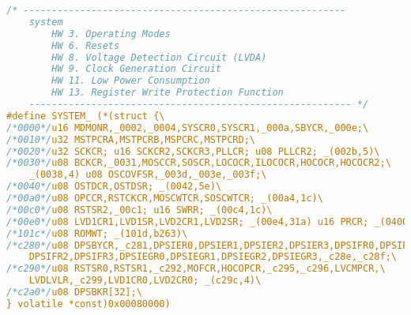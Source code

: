 \documentclass[a4paper, 11pt, fleqn, twoside]{scrartcl}%
\begin{document}
\begin{lstlisting}[language=C,backgroundcolor=\color{orange!10},framerule=0pt,columns=fixed]
	/* ---------------------------------------------------------
	system
		HW 3. Operating Modes
		HW 6. Resets
		HW 8. Voltage Detection Circuit (LVDA)
		HW 9. Clock Generation Circuit
		HW 11. Low Power Consumption
		HW 13. Register Write Protection Function
	--------------------------------------------------------- */
#define SYSTEM_ (*(struct {\
/*0000*/u16 MDMONR,_0002,_0004,SYSCR0,SYSCR1,_000a,SBYCR,_000e;\
/*0010*/u32 MSTPCRA,MSTPCRB,MSPCRC,MSTPCRD;\
/*0020*/u32 SCKCR; u16 SCKCR2,SCKCR3,PLLCR; u08 PLLCR2; _(002b,5)\
/*0030*/u08 BCKCR,_0031,MOSCCR,SOSCR,LOCOCR,ILOCOCR,HOCOCR,HOCOCR2;\
    _(0038,4) u08 OSCOVFSR,_003d,_003e,_003f;\
/*0040*/u08 OSTDCR,OSTDSR; _(0042,5e)\
/*00a0*/u08 OPCCR,RSTCKCR,MOSCWTCR,SOSCWTCR; _(00a4,1c)\
/*00c0*/u08 RSTSR2,_00c1; u16 SWRR; _(00c4,1c)\
/*00e0*/u08 LVD1CR1,LVD1SR,LVD2CR1,LVD2SR; _(00e4,31a) u16 PRCR; _(0400,c1c)\
/*101c*/u08 ROMWT; _(101d,b263)\
/*c280*/u08 DPSBYCR,_c281,DPSIER0,DPSIER1,DPSIER2,DPSIER3,DPSIFR0,DPSIFR1,\
    DPSIFR2,DPSIFR3,DPSIEGR0,DPSIEGR1,DPSIEGR2,DPSIEGR3,_c28e,_c28f;\
/*c290*/u08 RSTSR0,RSTSR1,_c292,MOFCR,HOCOPCR,_c295,_c296,LVCMPCR,\
    LVDLVLR,_c299,LVD1CR0,LVD2CR0; _(c29c,4)\
/*c2a0*/u08 DPSBKR[32];\
} volatile *const)0x00080000)
\end{lstlisting}
\end{document}
